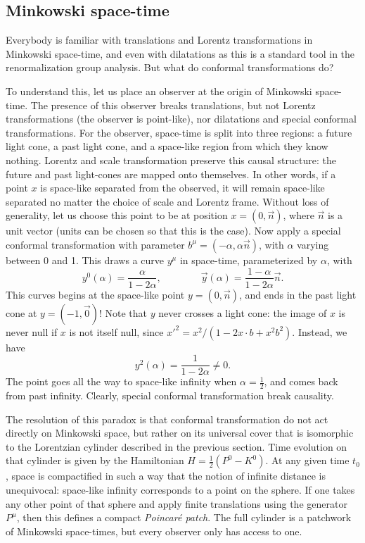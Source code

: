 \documentclass[a4paper,12pt]{article}
\numberwithin{equation}{section}
\begin{document}
\subsection{Minkowski space-time}

Everybody is familiar with translations and Lorentz transformations in Minkowski space-time, and even with dilatations as this is a standard tool in the renormalization group analysis. But what do conformal transformations do?

To understand this, let us place an observer at the origin of Minkowski space-time. The presence of this observer breaks translations, but not Lorentz transformations (the observer is point-like), nor dilatations and special conformal transformations. For the observer, space-time is split into three regions: a future light cone, a past light cone, and a   space-like region from which they know nothing.
Lorentz and scale transformation preserve this causal structure: the future and past light-cones are mapped onto themselves. In other words, if a point $x$ is space-like separated from the observed, it will remain space-like separated no matter the choice of scale and Lorentz frame. Without loss of generality, let us choose this point to be at position $x = (0, \vec{n})$, where $\vec{n}$ is a unit vector (units can be chosen so that this is the case).
Now apply a special conformal transformation with parameter $b^\mu = (-\alpha, \alpha \vec{n})$, with $\alpha$ varying between 0 and 1.
This draws a curve $y^\mu $ in space-time, parameterized by $\alpha$,
with
\begin{equation}
	y^0(\alpha) = \frac{\alpha}{1 - 2 \alpha},
	\qquad\qquad
	\vec{y}(\alpha) = \frac{1 - \alpha}{1 - 2 \alpha} \vec{n}.
\end{equation}
This curves begins at the space-like point $y = (0, \vec{n})$, and ends in the past light cone at $y = (-1, \vec{0})$!
Note that $y$ never crosses a light cone: the image of $x$ is never null if $x$ is not itself null, since $x'^2 = x^2 / (1 - 2 x \cdot b + x^2 b^2)$.
Instead, we have
\begin{equation}
	y^2(\alpha) = \frac{1}{1 - 2\alpha} \neq 0.
\end{equation}
The point goes all the way to space-like infinity when $\alpha = \frac{1}{2}$, and comes back from past infinity.
Clearly, special conformal transformation break causality.

The resolution of this paradox is that conformal transformation do not act directly on Minkowski space, but rather on its universal cover that is isomorphic to the Lorentzian cylinder described in the previous section.
Time evolution on that cylinder is given by the Hamiltonian $H = \frac{1}{2} (P^0 - K^0)$. At any given time $t_0$, space is compactified in such a way that the notion of infinite distance is unequivocal: space-like infinity corresponds to a point on the sphere. If one takes any other point of that sphere and apply finite translations using the generator $P^\mu$, then this defines a compact \emph{Poincaré patch}. The full cylinder is a patchwork of Minkowski space-times, but every observer only has access to one.
\end{document}
